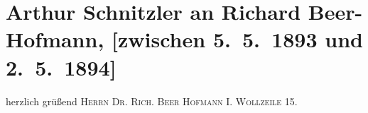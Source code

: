

         
         \renewcommand{\erwaehntePersonen}{Personen: Richard Beer-Hofmann, Johann Schnitzler}
         \renewcommand{\erwaehnteOrte}{Orte: Wien, Wollzeile}
         \renewcommand{\erwaehnteWerke}{}
               \section[Arthur Schnitzler an Richard Beer-Hofmann, {[}zwischen 5. 5. 1893 und 2. 5. 1894{]}]{ Arthur Schnitzler an Richard Beer-Hofmann, {[}zwischen 5. 5. 1893 und
               2. 5. 1894{]}}\nopagebreak{}\rehead{ }\begin{ledgroupsized}[t]{13cm}\normalsize\beginnumbering \toendnotes[C]{\smallbreak\pagebreak[2]} 
\toendnotes[C]{\smallbreak}\pstart
           \noindent{}\centering{}{\pb}\textcolor{gray}{\textbf{\label{K_L00213-1v}\label{K_L00213-1h}}}\pend
           \pstart
           \noindent{}herzlich grüßend\pend
           \pstart
           {\pb}\textsc{Herrn Dr. Rich. Beer Hofmann}\pend
           \pstart
           \textsc{I. Wollzeile 15.}\pend
           
         
         \endnumbering{}\end{ledgroupsized}  \newcommand{\dateiname}{L00213}\newcommand{\titel}{Arthur Schnitzler an Richard Beer-Hofmann, [zwischen 5. 5. 1893 und 2. 5. 1894]}\newcommand{\editorInnen}{Martin Anton Müller und Gerd-Hermann Susen}
      